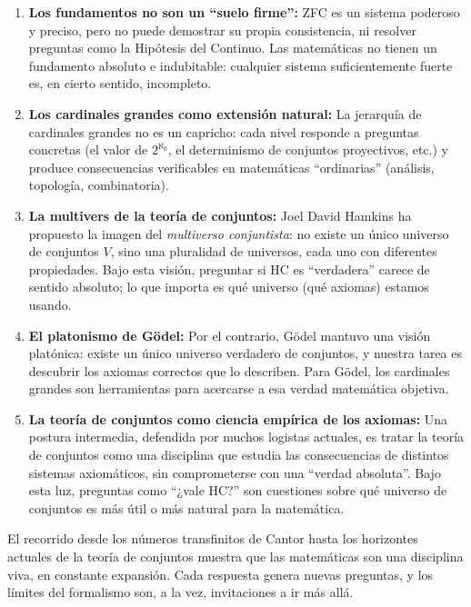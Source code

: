 \begin{enumerate}[leftmargin=2em, label=\textbf{R\arabic*.}]
  \item \textbf{Los fundamentos no son un ``suelo firme'':} ZFC es un sistema poderoso y preciso, pero no puede demostrar su propia consistencia, ni resolver preguntas como la Hipótesis del Continuo. Las matemáticas no tienen un fundamento absoluto e indubitable: cualquier sistema suficientemente fuerte es, en cierto sentido, incompleto.

  \item \textbf{Los cardinales grandes como extensión natural:} La jerarquía de cardinales grandes no es un capricho: cada nivel responde a preguntas concretas (el valor de $2^{\aleph_0}$, el determinismo de conjuntos proyectivos, etc.) y produce consecuencias verificables en matemáticas ``ordinarias'' (análisis, topología, combinatoria).

  \item \textbf{La multivers de la teoría de conjuntos:} Joel David Hamkins ha propuesto la imagen del \emph{multiverso conjuntista}: no existe un único universo de conjuntos $V$, sino una pluralidad de universos, cada uno con diferentes propiedades. Bajo esta visión, preguntar si HC es ``verdadera'' carece de sentido absoluto; lo que importa es qué universo (qué axiomas) estamos usando.

  \item \textbf{El platonismo de Gödel:} Por el contrario, Gödel mantuvo una visión platónica: existe un único universo verdadero de conjuntos, y nuestra tarea es descubrir los axiomas correctos que lo describen. Para Gödel, los cardinales grandes son herramientas para acercarse a esa verdad matemática objetiva.

  \item \textbf{La teoría de conjuntos como ciencia empírica de los axiomas:} Una postura intermedia, defendida por muchos logistas actuales, es tratar la teoría de conjuntos como una disciplina que estudia las consecuencias de distintos sistemas axiomáticos, sin comprometerse con una ``verdad absoluta''. Bajo esta luz, preguntas como ``¿vale HC?'' son cuestiones sobre qué universo de conjuntos es más útil o más natural para la matemática.
\end{enumerate}

\begin{importante}
El recorrido desde los números transfinitos de Cantor hasta los horizontes actuales de la teoría de conjuntos muestra que las matemáticas son una disciplina viva, en constante expansión. Cada respuesta genera nuevas preguntas, y los límites del formalismo son, a la vez, invitaciones a ir más allá.
\end{importante}

